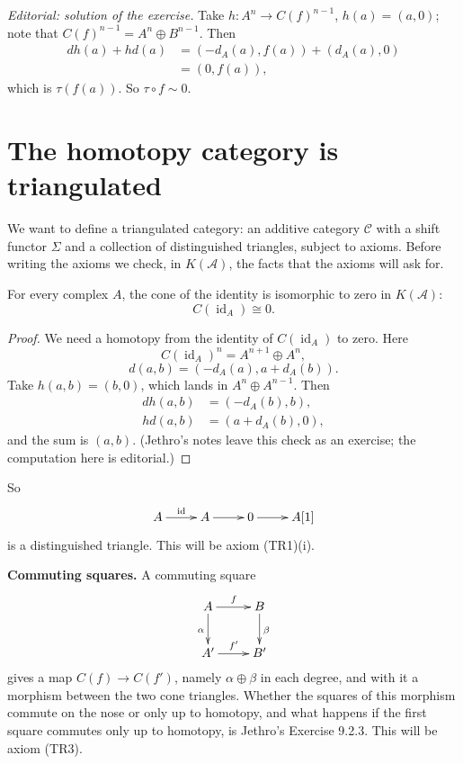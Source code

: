 \medskip\noindent
{\it Editorial: solution of the
exercise.} Take $h:A^n\to C(f)^{n-1}$,
$h(a)=(a,0)$; note that
$C(f)^{n-1}=A^n\oplus B^{n-1}$. Then
$$
\begin{aligned}
dh(a)+hd(a)
&=(-d_A(a),f(a))+(d_A(a),0)\\
&=(0,f(a)),
\end{aligned}
$$
which is $\tau(f(a))$. So
$\tau\circ f\sim 0$.

\section{The homotopy category is triangulated}
\label{section-homotopy-category-triangulated}

\noindent
We want to define a triangulated
category: an additive category
$\mathcal{C}$ with a shift functor
$\Sigma$ and a collection of
distinguished triangles, subject to
axioms. Before writing the axioms we
check, in $K(\mathcal{A})$, the facts
that the axioms will ask for.

\begin{lemma}
\label{lemma-cone-identity-zero}
For every complex $A$, the cone of the
identity is isomorphic to zero in
$K(\mathcal{A})$:
$$
C(\operatorname{id}_A)\cong 0.
$$
\end{lemma}

\begin{proof}
We need a homotopy from the identity of
$C(\operatorname{id}_A)$ to zero. Here
$$
C(\operatorname{id}_A)^n
=A^{n+1}\oplus A^n,
$$
$$
d(a,b)=(-d_A(a),a+d_A(b)).
$$
Take $h(a,b)=(b,0)$, which lands in
$A^n\oplus A^{n-1}$. Then
$$
\begin{aligned}
dh(a,b)&=(-d_A(b),b),\\
hd(a,b)&=(a+d_A(b),0),
\end{aligned}
$$
and the sum is $(a,b)$. (Jethro's notes
leave this check as an exercise; the
computation here is editorial.)
\end{proof}

\noindent
So
$$
\xymatrix{
A\ar[r]^-{\operatorname{id}}
&A\ar[r]
&0\ar[r]
&A[1]
}
$$
is a distinguished triangle. This will
be axiom (TR1)(i).

\medskip\noindent
{\bf Commuting squares.} A commuting
square
$$
\xymatrix{
A\ar[r]^{f}\ar[d]_{\alpha}
&B\ar[d]^{\beta}\\
A'\ar[r]^{f'}
&B'
}
$$
gives a map $C(f)\to C(f')$, namely
$\alpha\oplus\beta$ in each degree, and
with it a morphism between the two cone
triangles. Whether the squares of this
morphism commute on the nose or only up
to homotopy, and what happens if the
first square commutes only up to
homotopy, is Jethro's Exercise 9.2.3.
This will be axiom (TR3).


